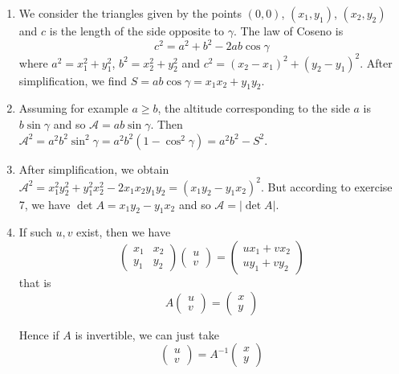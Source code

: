 \begin{enumerate}
\item
  We consider the triangles given by the points
  $(0,0)$, $(x_1, y_1)$, $(x_2,y_2)$ and $c$ is the length of the side opposite
  to $\gamma$.
  The law of Coseno is
  $$c^2 = a^2 + b^2 - 2ab\cos\gamma$$
  where
  $a^2 = x_1^2 + y_1^2$, $b^2 = x_2^2 + y_2^2$ and
  $c^2 = \left(x_2-x_1\right)^2 + \left(y_2-y_1\right)^2$. After simplification,
  we find
  $S = a b \cos \gamma = x_1x_2 + y_1y_2$.
\item
  Assuming for example $a \geq b$, the altitude corresponding to the side $a$
  is $b \sin \gamma$ and so
  $\mathscr A = a b \sin \gamma$.
  Then ${\mathscr A}^2 = a^2 b^2 \sin^2 \gamma =
  a^2b^2 \left(1 - \cos^2 \gamma\right) =
  a^2b^2 - S^2$.
\item
  After simplification, we obtain
  ${\mathscr A}^2 = x_1^2y_2^2 +y_1^2x_2^2 - 2x_1x_2y_1y_2 =
  {(x_1y_2 - y_1x_2)}^2$.
  But according to exercise 7, we have
  $\det A = x_1y_2 - y_1x_2$ and so
  $\mathscr A = \left| \det A \right|$.

\item
  If such $u, v$ exist, then we have
  $$\begin{pmatrix} x_1 & x_2 \\ y_1 & y_2 \end{pmatrix}
  \begin{pmatrix} u \\ v \end{pmatrix} =
  \begin{pmatrix} u x_1 + v x_2  \\ u y_1 + v y_2 \end{pmatrix}
  $$
  that is
  $$A \begin{pmatrix} u \\ v \end{pmatrix} =
  \begin{pmatrix} x \\ y \end{pmatrix}$$

  Hence if $A$ is invertible, we can just take
  $$\begin{pmatrix} u \\ v \end{pmatrix} = A^{-1}
  \begin{pmatrix} x \\ y \end{pmatrix}$$


\end{enumerate}
